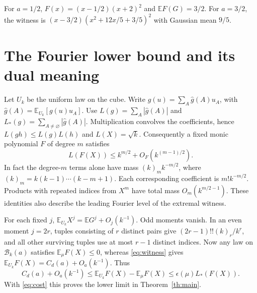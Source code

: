 \documentclass[11pt,letterpaper]{article}
\theoremstyle{research}
\newcommand{\E}{\mathbb E}\newcommand{\R}{\mathbb R}\newcommand{\N}{\mathbb N}
\newcommand{\U}{U_k}\newcommand{\He}{H}
\newcommand{\low}{\mathcal B_k(a)}\newcommand{\high}{\mathcal D_k(a)}
\newcommand{\sect}[1]{\section{\texorpdfstring{\color{ink}#1}{#1}}}
\begin{document}
For $a=1/2$, $F(x)=(x-1/2)(x+2)^2$ and $\E F(G)=3/2$.
For $a=3/2$, the witness is
$(x-3/2)(x^2+12x/5+3/5)^2$ with Gaussian mean $9/5$.
\clearpage
\sect{The Fourier lower bound and its dual meaning}
Let $\U$ be the uniform law on the cube. Write
$g(u)=\sum_A\widehat g(A)u_A$, with $\widehat g(A)=\E_{\U}[g(u)u_A]$.
Use $L(g)=\sum_A|\widehat g(A)|$ and
$L_*(g)=\sum_{A\ne\varnothing}|\widehat g(A)|$. Multiplication convolves
the coefficients, hence $L(gh)\le L(g)L(h)$ and $L(X)=\sqrt k$. Consequently
a fixed monic polynomial $F$ of degree $m$ satisfies
\begin{equation}\label{eq:cost}
 L(F(X))\le k^{m/2}+O_F(k^{(m-1)/2}).
\end{equation}
In fact the degree-$m$ terms alone have mass $(k)_m k^{-m/2}$, where
$(k)_m=k(k-1)\cdots(k-m+1)$. Each corresponding coefficient is
$m!k^{-m/2}$. Products with repeated indices from $X^m$ have total mass
$O_m(k^{m/2-1})$. These identities also describe the leading Fourier
level of the extremal witness.

For each fixed $j$, $\E_{\U}X^j=\E G^j+O_j(k^{-1})$.
Odd moments vanish. In an even moment $j=2r$, tuples consisting of $r$
distinct pairs give $(2r-1)!!(k)_r/k^r$, and all other surviving tuples
use at most $r-1$ distinct indices. Now any law on $\low$ satisfies
$\E_\mu F(X)\le0$, whereas \eqref{eq:witness} gives
$\E_{\U}F(X)=C_d(a)+O_a(k^{-1})$. Thus
\[
 C_d(a)+O_a(k^{-1})\le
 \E_{\U}F(X)-\E_\mu F(X)\le \epsilon(\mu)L_*(F(X)).
\]
With \eqref{eq:cost} this proves the lower limit in Theorem~\ref{th:main}.
\end{document}
